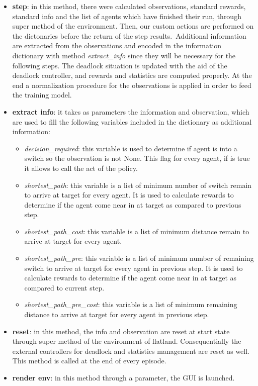 \begin{itemize}
\item \textbf{step}: in this method, there were calculated observations, standard rewards, standard info and the list of agents which have finished their run, through super method of the environment.
Then, our custom actions are performed on the dictonaries before the return of the step results.\ Additional information are extracted from the observations and encoded in the information dictionary with method \textit{extract\_info} since they will be necessary for the following steps. The deadlock situation is updated with the aid of the deadlock controller, and rewards and statistics are computed properly. At the end a normalization procedure for the observations is applied in order to feed the training model.
\item \textbf{extract info}: it takes as parameters the information and observation, which are used to fill the following variables included in the dictionary as additional information:
\begin{itemize}
\item \textit{decision\_required}: this variable is used to determine if agent is into a switch so the observation is not None. This flag for every agent, if is true it allows to call the act of the policy.
\item \textit{shortest\_path}: this variable is a list of minimum number of switch remain to arrive at target for every agent. It is used to calculate rewards to determine if the agent come near in at target as compared to previous step.
\item \textit{shortest\_path\_cost}: this variable is a list of minimum distance remain to arrive at target for every agent.
\item \textit{shortest\_path\_pre}: this variable is a list of minimum number of remaining switch to arrive at target for every agent in previous step. It is used to calculate rewards to determine if the agent come near in at target as compared to current step.
\item \textit{shortest\_path\_pre\_cost}: this variable is a list of minimum remaining distance to arrive at target for every agent in previous step.
\end{itemize}
\item \textbf{reset}: in this method, the info and observation are reset at start state through super method of the environment of flatland. Consequentially the external controllers for deadlock and statistics management are reset as well. This method is called at the end of every episode.
\item \textbf{render env}: in this method through a parameter, the GUI is launched.
\end{itemize}
